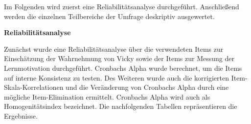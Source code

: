 Im Folgenden wird zuerst eine Reliabilitätsanalyse durchgeführt. Anschließend werden die einzelnen Teilbereiche der Umfrage deskriptiv ausgewertet.

\textbf{Reliabilitätsanalyse}

Zunächst wurde eine Reliabilitätsanalyse über die verwendeten Items zur Einschätzung der Wahrnehmung von Vicky sowie
der Items zur Messung der Lernmotivation durchgeführt.
Cronbachs Alpha wurde berechnet, um die Items auf interne Konsistenz zu testen. 
Des Weiteren wurde auch die korrigierten Item-Skala-Korrelationen und die Veränderung von Cronbachs Alpha durch eine mögliche Item-Elimination 
ermittelt. Cronbachs Alpha wird auch als Homogenitätsindex bezeichnet. \parencite[291]{Eckstein.2004}
Die nachfolgenden Tabellen repräsentieren die Ergebnisse. \\

